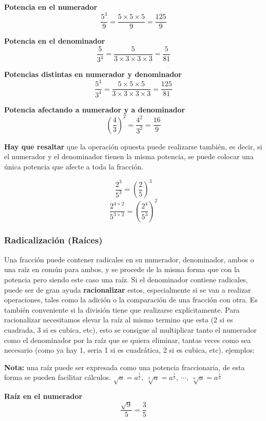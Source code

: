 \documentclass[12pt]{article}
\begin{document}
    \textbf{Potencia en el numerador}
    $$\frac{5^3}{9} = \frac{5\times5\times5}{9} =\frac{125}{9} $$

    \textbf{Potencia en el denominador}
    $$\frac{5}{3^4} = \frac{5}{3\times3\times3\times3} =\frac{5}{81} $$

    \textbf{Potencias distintas en numerador y denominador}
    $$\frac{5^3}{3^4} = \frac{5\times5\times5}{3\times3\times3\times3} = \frac{125}{81} $$

    \textbf{Potencia afectando a numerador y a denominador}
    $$ \left(\frac{4}{3}\right)^2 =  \frac{4^2}{3^2} = \frac{16}{9} $$


    \textbf{Hay que resaltar} que la operación opuesta puede realizarse también,
    es decir, si el numerador y el denominador tienen la misma potencia, se puede
    colocar una única potencia que afecte a toda la fracción.

    $$\frac{2^3}{5^3} = \left(\frac{2}{5}\right)^3 $$
    $$\frac{2^{4\times2}}{5^{3\times2}} =  \left(\frac{2^4}{5^3}\right)^2 $$


\subsubsection*{Radicalización (Raíces)}\label{radicalización}
    Una fracción puede contener radicales en su numerador, denominador, ambos o
    una raíz en común para  ambos, y se procede de la misma forma que con la potencia
    pero siendo este caso una raíz.
    Si el denominador contiene radicales, puede ser de gran ayuda \textbf{racionalizar}
    estos, especialmente si se van a realizar operaciones, tales como la
    adición o la comparación de una fracción con otra. Es también conveniente
    si la división tiene que realizarse explícitamente.
    Para racionalizar necesitamos elevar la raíz al mismo termino que esta (2
    si es cuadrada, 3 si es cubica, etc), esto se consigue al multiplicar tanto el
    numerador como el denominador por la raíz que se quiera eliminar, tantas veces
    como sea necesario (como ya hay 1, seria 1 si es cuadrática, 2 si es cubica, etc).
    ejemplos:

    \textbf{Nota:} una raíz puede ser expresada como una potencia fraccionaria,
    de esta forma se pueden facilitar cálculos.
    $\displaystyle \sqrt{a} = a^{\frac{1}{2}},\  \sqrt[3]{a} = a^{\frac{1}{3}},\ \cdots,\ \sqrt[n]{a}=a^{\frac{1}{n}}$


    \textbf{Raíz en el numerador}
    $$\frac{\sqrt{9}}{5} = \frac{3}{5} $$
\end{document}

